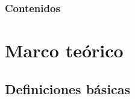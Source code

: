 


\frame{\titlepage}

\begin{frame}
\frametitle{Contenidos}
\tableofcontents
\end{frame}

\section{Marco teórico}
\subsection{Definiciones básicas}
